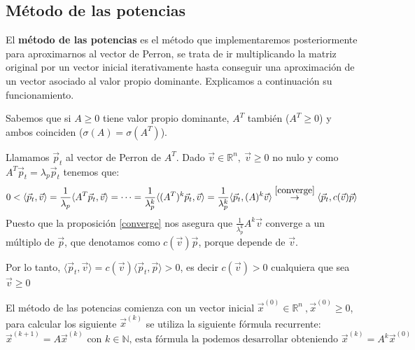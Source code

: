 \documentclass[size=a4, parskip=half, titlepage=false, toc=flat, toc=bib, 12pt, twoside]{scrartcl}
\theoremstyle{theorem-style}
\theoremstyle{definition-style}
\theoremstyle{remark-style}
\theoremstyle{example-style}
\theoremstyle{definition-style}
\theoremstyle{remark-style}
\begin{document}
\newpage

\subsection{Método de las potencias}

El \textbf{método de las potencias} es el método que implementaremos posteriormente para aproximarnos al vector de Perron, se trata de ir multiplicando la matriz original por un vector inicial iterativamente hasta conseguir una aproximación de un vector asociado al valor propio dominante. Explicamos a continuación su funcionamiento.

Sabemos que si $A \geq 0$ tiene valor propio dominante, $A^T$ también ($A^T \geq 0$) y
ambos coinciden ($\sigma(A) = \sigma(A^T)$).

Llamamos $\vec{p}_t$ al vector de Perron de $A^T$. Dado $\vec{v} \in \mathbb{R}^n , \ \vec{v} \geq 0$ no nulo y como $A^T \vec{p}_t = \lambda_p \vec{p}_t $ tenemos que:
$$0 < \langle \vec{p}_t, \vec{v} \rangle = \frac{1}{\lambda_p} \langle A^T \vec{p}_t, \vec{v} \rangle = \cdots = \frac{1}{\lambda_p^k} \langle (A^T)^k \vec{p}_t , \vec{v} \rangle =  \frac{1}{\lambda_p^k} \langle \vec{p}_t , (A)^k \vec{v} \rangle \overset{\ref{converge}} \rightarrow \langle \vec{p}_t , c(\vec{v})\vec{p} \rangle$$
Puesto que la proposición \ref{converge} nos asegura que $\frac{1}{\lambda_p^k} A^k \vec{v}$ converge a un múltiplo de $\vec{p}$, que denotamos como $c(\vec{v})\vec{p}$, porque depende de $\vec{v}$.

Por lo tanto, $\langle \vec{p}_t , \vec{v} \rangle = c(\vec{v}) \langle \vec{p}_t , \vec{p} \rangle > 0$, es decir $c(\vec{v}) >0$ cualquiera que sea $\vec{v} \geq 0$

El método de las potencias comienza con un vector inicial $\vec{x}^{(0)} \in \mathbb{R}^n  \ , \vec{x}^{(0)} \geq 0$, para calcular los siguiente $\vec{x}^{(k)}$ se utiliza la siguiente fórmula recurrente:
$$\vec{x}^{(k+1)} = A \vec{x}^{(k)} \textrm{ con } k \in \mathbb{N} \textrm{, esta fórmula la podemos desarrollar obteniendo } \vec{x}^{(k)} = A^k \vec{x}^{(0)}$$
\end{document}
